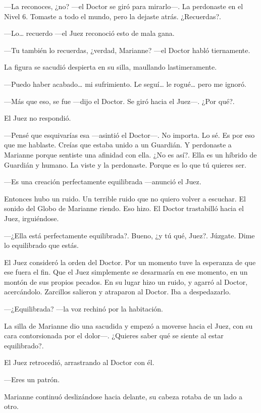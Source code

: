 ---La reconoces, ¿no? ---el Doctor se giró para mirarlo---. La
perdonaste en el Nivel 6. Tomaste a todo el mundo, pero la dejaste
atrás. ¿Recuerdas?.

---Lo\ldots{} recuerdo ---el Juez reconoció esto de mala gana.

---Tu también lo recuerdas, ¿verdad, Marianne? ---el Doctor habló
tiernamente.

La figura se sacudió despierta en su silla, maullando lastimeramente.

---Puedo haber acabado\ldots{} mi sufrimiento. Le seguí\ldots{} le
rogué\ldots{} pero me ignoró.

---Más que eso, se fue ---dijo el Doctor. Se giró hacia el Juez---. ¿Por
qué?.

El Juez no respondió.

---Pensé que esquivarías esa ---asintió el Doctor---. No importa. Lo sé.
Es por eso que me hablaste. Creías que estaba unido a un Guardián. Y
perdonaste a Marianne porque sentiste una afinidad con ella. ¿No es
así?. Ella es un híbrido de Guardián y humano. La viste y la perdonaste.
Porque es lo que tú quieres ser.

---Es una creación perfectamente equilibrada ---anunció el Juez.

Entonces hubo un ruido. Un terrible ruido que no quiero volver a
escuchar. El sonido del Globo de Marianne riendo. Eso hizo. El Doctor
trastabilló hacia el Juez, irguiéndose.

---¿Ella está perfectamente equilibrada?. Bueno, ¿y tú qué, Juez?.
Júzgate. Dime lo equilibrado que estás.

El Juez consideró la orden del Doctor. Por un momento tuve la esperanza
de que ese fuera el fin. Que el Juez simplemente se desarmaría en ese
momento, en un montón de sus propios pecados. En su lugar hizo un ruido,
y agarró al Doctor, acercándolo. Zarcillos salieron y atraparon al
Doctor. Iba a despedazarlo.

---¿Equilibrada? ---la voz rechinó por la habitación.

La silla de Marianne dio una sacudida y empezó a moverse hacia el Juez,
con su cara contorsionada por el dolor---. ¿Quieres saber qué se siente
al estar equilibrado?.

El Juez retrocedió, arrastrando al Doctor con él.

---Eres un patrón.

Marianne continuó deslizándose hacia delante, su cabeza rotaba de un
lado a otro.

